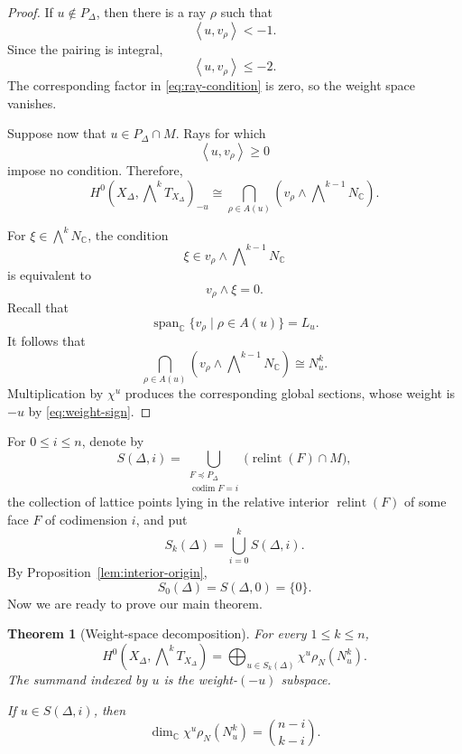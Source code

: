 \documentclass[colorlinks,11pt,reqno]{amsart}
\newtheorem{theorem}{Theorem}[section]
\theoremstyle{definition}
\theoremstyle{remark}
\numberwithin{equation}{section}
\numberwithin{equation}{section}
\newcommand{\CC}{\mathbb{C}}
\newcommand{\Pair}[2]{\left\langle #1,#2\right\rangle}
\newcommand{\C}{\mathbb{C}}
\DeclareMathOperator{\relint}{relint}
\DeclareMathOperator{\codim}{codim}
\begin{document}
\begin{proof}
If \(u\notin P_\Delta\), then there is a ray \(\rho\) such that
\[
\Pair{u}{v_\rho}<-1.
\]
Since the pairing is integral,
\[
\Pair{u}{v_\rho}\leq -2.
\]
The corresponding factor in \eqref{eq:ray-condition} is zero, so the weight space vanishes.

Suppose now that \(u\in P_\Delta\cap M\). Rays for which
\[
\Pair{u}{v_\rho}\geq 0
\]
impose no condition. Therefore,
\[
H^0\!\left(X_\Delta,\bigwedge\nolimits^kT_{X_\Delta}\right)_{-u} \cong
\bigcap_{\rho\in A(u)} \left(v_\rho\wedge \bigwedge\nolimits^{k-1}N_{\CC} \right).
\]

For \(\xi\in\bigwedge^kN_{\CC}\), the condition
\[
\xi \in v_\rho\wedge\bigwedge\nolimits^{k-1}N_{\CC}
\]
is equivalent to
\[
v_\rho\wedge\xi=0.
\]
Recall that
\[
  \operatorname{span}_\C\{v_\rho \mid \rho \in A(u)\} = L_u.
\]
It follows that
\[
\bigcap_{\rho\in A(u)} \left(v_\rho\wedge \bigwedge\nolimits^{k-1}N_{\CC} \right) \cong N_u^k.
\]
Multiplication by \(\chi^u\) produces the corresponding global sections, whose weight is \(-u\) by
\eqref{eq:weight-sign}.
\end{proof}

For \(0\leq i\leq n\), denote by
\[
S(\Delta, i) = \bigcup_{\substack{F\preceq P_\Delta\\
                  \codim F=i}} \bigl(\relint(F)\cap M\bigr),
\]
the collection of lattice points lying in the relative interior $\relint(F)$ of some face $F$ of codimension $i$, and put
\[
S_k(\Delta) = \bigcup_{i=0}^{k}S(\Delta,i).
\]
By Proposition~\ref{lem:interior-origin},
\[
S_0(\Delta) = S(\Delta, 0) = \{0\}.
\]
Now we are ready to prove our main theorem.
\begin{theorem}[Weight-space decomposition]\label{thm:main}
For every \(1\leq k\leq n\),
\begin{equation}\label{eq:main-decomposition}
H^0\!\left( X_\Delta,\bigwedge\nolimits^kT_{X_\Delta} \right)
= \bigoplus_{u\in S_k(\Delta)} \chi^u\rho_N(N_u^k).
\end{equation}
The summand indexed by \(u\) is the weight-\((-u)\) subspace.

If \(u\in S(\Delta,i)\), then
\begin{equation}\label{eq:weight-dimension}
\dim_{\CC}\chi^u\rho_N(N_u^k) = \binom{n-i}{k-i}.
\end{equation}
\end{theorem}
\end{document}
